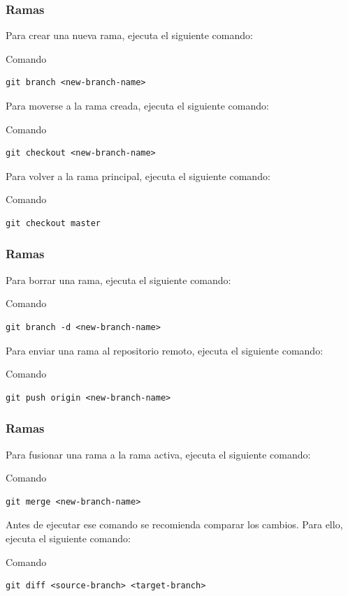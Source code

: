 \documentclass{beamer}
\begin{document}
\begin{frame}[fragile]
\frametitle{Ramas}
Para crear una nueva rama, ejecuta el siguiente comando:
\begin{block}{Comando}
\begin{verbatim}
git branch <new-branch-name>
\end{verbatim}
\end{block}
\vskip 0.25cm
Para moverse a la rama creada, ejecuta el siguiente comando:
\begin{block}{Comando}
\begin{verbatim}
git checkout <new-branch-name>
\end{verbatim}
\end{block}
\vskip 0.25cm
Para volver a la rama principal, ejecuta el siguiente comando:
\begin{block}{Comando}
\begin{verbatim}
git checkout master
\end{verbatim}
\end{block}
\end{frame}

\begin{frame}[fragile]
\frametitle{Ramas}
Para borrar una rama, ejecuta el siguiente comando:
\begin{block}{Comando}
\begin{verbatim}
git branch -d <new-branch-name>
\end{verbatim}
\end{block}
\vskip 0.50cm
Para enviar una rama al repositorio remoto, ejecuta el siguiente comando:
\begin{block}{Comando}
\begin{verbatim}
git push origin <new-branch-name>
\end{verbatim}
\end{block}
\end{frame}

\begin{frame}[fragile]
\frametitle{Ramas}
Para fusionar una rama a la rama activa, ejecuta el siguiente comando:
\begin{block}{Comando}
\begin{verbatim}
git merge <new-branch-name>
\end{verbatim}
\end{block}
\vskip 0.50cm
Antes de ejecutar ese comando se recomienda comparar los cambios. Para ello, ejecuta el siguiente comando:
\begin{block}{Comando}
\begin{verbatim}
git diff <source-branch> <target-branch>
\end{verbatim}
\end{block}
\end{frame}
\end{document}
